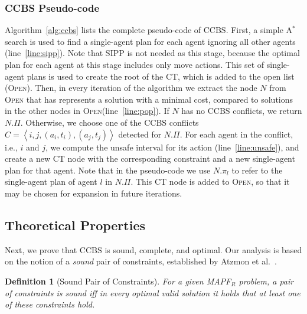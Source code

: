 \documentclass[review]{elsarticle}
\newtheorem{definition}{Definition}
\newcommand{\tuple}[1]{\ensuremath{\left \langle #1 \right \rangle }}
\newcommand\konstantin[1]{\nb{\textbf{Konstantin:}}{red}{#1}}
\newcommand\roni[1]{\nb{\textbf{Roni:}}{green}{#1}}
\newcommand\dor[1]{\nb{\textbf{Dor:}}{Fuchsia}{#1}}
\newcommand{\ccbs}{\ac{CCBS}\xspace}
\newcommand{\ct}{\ac{CT}\xspace}
\newcommand{\sipp}{\ac{SIPP}\xspace}
\newcommand{\astar}{A$^*$\xspace}
\newcommand{\mapfr}{\ac{MAPF}$_R$\xspace}
\newcommand{\OPEN}{\textsc{Open}\xspace}
\newcommand{\shortcite}{\cite}
\begin{document}
\subsubsection{\ccbs Pseudo-code}
Algorithm~\ref{alg:ccbs} lists the complete pseudo-code of \ccbs. First, a simple \astar search is used to find a single-agent plan for each agent ignoring all other agents (line~\ref{line:sipp}). Note that \sipp is not needed as this stage, because the optimal plan for each agent at this stage includes only move actions. %
This set of single-agent plans is used to create the root of the \ct, which is added to the open list (\OPEN). 
Then, in every iteration of the algorithm we extract the node $N$ from \OPEN that has represents a solution with a minimal cost, compared to solutions in the other nodes in \OPEN (line~\ref{line:pop}). 
If $N$ has no \ccbs conflicts, we return $N.\Pi$. 
Otherwise, we choose one of the \ccbs conflicts $C=\tuple{i,j, (a_i,t_i), (a_j,t_j)}$ detected for $N.\Pi$. 
For each agent in the conflict, i.e., $i$ and $j$, we compute the unsafe interval for its action (line~\ref{line:unsafe}), and create a new \ct node with the corresponding constraint and a new single-agent plan for that agent. 
Note that in the pseudo-code we use $N.\pi_l$ to refer to the single-agent plan of agent $l$ in $N.\Pi$. This \ct node is added to \OPEN, so that it may be chosen for expansion in future iterations. 


\subsection{Theoretical Properties}



Next, we prove that \ccbs is sound, complete, and optimal. Our analysis is based on the notion of a \emph{sound} pair of constraints, established by Atzmon et al.~\shortcite{atzmon2018robust}. 

\begin{definition}[Sound Pair of Constraints]
For a given \mapfr problem, a pair of constraints is sound iff in every optimal valid solution it holds that at least one of these constraints hold. 
\label{def:sound}
\end{definition}
 
\end{document}

